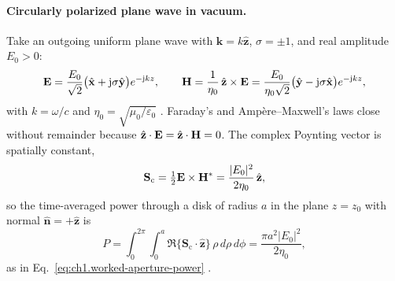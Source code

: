 \paragraph{Circularly polarized plane wave in vacuum.}
Take an outgoing uniform plane wave with $\mathbf{k}=k\hat{\mathbf{z}}$, $\sigma=\pm1$, and real amplitude $E_0>0$:
\begin{equation}
\label{eq:ch1.ex61-cp-EH}
\mathbf{E}=\frac{E_0}{\sqrt{2}}\bigl(\hat{\mathbf{x}}+\mathrm{j}\sigma\hat{\mathbf{y}}\bigr)e^{-\mathrm{j} kz},
\qquad
\mathbf{H}=\frac{1}{\eta_0}\,\hat{\mathbf{z}}\times\mathbf{E}
=\frac{E_0}{\eta_0\sqrt{2}}\bigl(\hat{\mathbf{y}}-\mathrm{j}\sigma\hat{\mathbf{x}}\bigr)e^{-\mathrm{j} kz},
\end{equation}
with $k=\omega/c$ and $\eta_0=\sqrt{\mu_0/\varepsilon_0}$ \cite{stratton1941}. Faraday's and Amp\`ere--Maxwell's laws close without remainder because $\hat{\mathbf{z}}\cdot\mathbf{E}=\hat{\mathbf{z}}\cdot\mathbf{H}=0$. The complex Poynting vector is spatially constant,
\begin{equation}
\label{eq:ch1.ex61-cp-poynting}
\mathbf{S}_\mathrm{c}=\tfrac12\mathbf{E}\times\mathbf{H}^*
=\frac{|E_0|^2}{2\eta_0}\,\hat{\mathbf{z}},
\end{equation}
so the time-averaged power through a disk of radius $a$ in the plane $z=z_0$ with normal $\hat{\mathbf{n}}=+\hat{\mathbf{z}}$ is
\begin{equation}
\label{eq:ch1.ex61-cp-power-disk}
P=\int_0^{2\pi}\!\int_0^a
\Re\{\mathbf{S}_\mathrm{c}\cdot\hat{\mathbf{z}}\}\,\rho\,d\rho\,d\phi
=\frac{\pi a^2|E_0|^2}{2\eta_0},
\end{equation}
as in Eq.~\eqref{eq:ch1.worked-aperture-power} \cite{poynting1884,stratton1941}.


